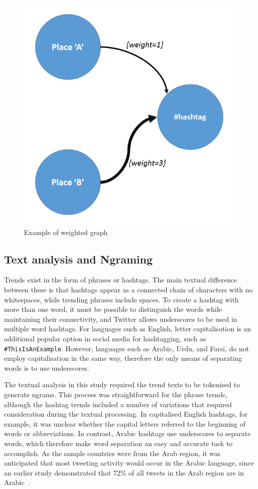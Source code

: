 \documentclass{comjnl}
\begin{document}
\begin{figure}[!ht] \centering
\includegraphics[width=\columnwidth]{images/w_graph.png}
\caption{Example of weighted graph}
\label{fig:w_graph}
\end{figure}


\subsection{Text analysis and Ngraming}

Trends exist in the form of phrases or hashtags. The main textual difference between these is that hashtags appear as a connected chain of characters with no whitespaces, while trending phrases include spaces. To create a hashtag with more than one word, it must be possible to distinguish the words while maintaining their connectivity, and Twitter allows underscores to be used in multiple word hashtags. For languages such as English, letter capitalisation is an additional popular option in social media for hashtagging, such as {\texttt{\#ThisIsAnExample}}. However, languages such as Arabic, Urdu, and Farsi, do not employ capitalisation in the same way, therefore the only means of separating words is to use underscores.

The textual analysis in this study required the trend texts to be tokenised to generate ngrams. This process was straightforward for the phrase trends, although the hashtag trends included a number of variations that required consideration during the textual processing. In capitalised English hashtags, for example, it was unclear whether the capital letters referred to the beginning of words or abbreviations. In contrast, Arabic hashtags use underscores to separate words, which therefore make word separation an easy and accurate task to accomplish. As the sample countries were from the Arab region, it was anticipated that most tweeting activity would occur in the Arabic language, since an earlier study demonstrated that 72\% of all tweets in the Arab region are in Arabic~\cite{Salem2017}.
\end{document}
